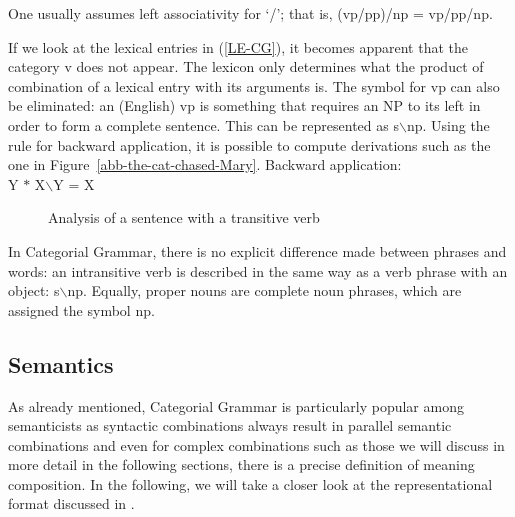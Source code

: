 \noindent
One usually assumes left associativity
for `/'; that is, (vp/pp)/np = vp/pp/np.\is{/|)}

If we look at the lexical entries in (\ref{LE-CG}), it becomes apparent that the category v does not
appear. The lexicon only determines what the product of combination of a lexical entry with its
arguments is. The symbol for vp can also be eliminated: an (English) vp is something that requires
an NP to its left in order to form a complete sentence. This\is{$\backslash$|(} can be represented
as s$\backslash$np. Using the rule for backward application, it is possible to compute derivations
such as the one in Figure~\vref{abb-the-cat-chased-Mary}. 
\ea
\label{backward-application}
Backward application:\\
Y $*$ X$\backslash$Y = X 
\z

\begin{figure}
\centerline{%
}
\caption{\label{abb-the-cat-chased-Mary}Analysis of a sentence with a transitive verb}
\end{figure}%

\noindent
In Categorial Grammar, there is no explicit difference made between phrases and words: an intransitive verb is described in the same way as a verb phrase with an
object:  s$\backslash$np. Equally, proper nouns are complete noun phrases, which are assigned the symbol np.\is{$\backslash$|)}

\subsection{Semantics}

\largerpage
As already mentioned, Categorial Grammar is particularly popular among semanticists as syntactic
combinations always result in parallel semantic combinations and even for complex combinations such
as those we will discuss in more detail in the following sections, there is a precise definition of
meaning composition.
In the following, we will take a closer look at the representational format discussed in \citet[Section~2.1.2]{Steedman97a}.

